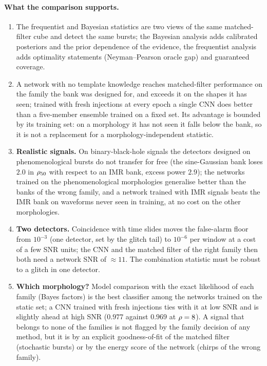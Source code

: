 \paragraph{What the comparison supports.}
\begin{enumerate}[nosep]
\item The frequentist and Bayesian statistics are two views of the same matched-filter cube and detect the same bursts; the Bayesian analysis adds calibrated posteriors and the prior dependence of the evidence, the frequentist analysis adds optimality statements (Neyman--Pearson oracle gap) and guaranteed coverage.
\item A network with no template knowledge reaches matched-filter performance on the family the bank was designed for, and exceeds it on the shapes it has seen; trained with fresh injections at every epoch a single CNN does better than a five-member ensemble trained on a fixed set. Its advantage is bounded by its training set: on a morphology it has not seen it falls below the bank, so it is not a replacement for a morphology-independent statistic.
\item \textbf{Realistic signals.} On binary-black-hole signals the detectors designed on phenomenological bursts do not transfer for free (the sine-Gaussian bank loses $2.0$ in $\rho_{50}$ with respect to an IMR bank, excess power $2.9$); the networks trained on the phenomenological morphologies generalise better than the banks of the wrong family, and a network trained with IMR signals beats the IMR bank on waveforms never seen in training, at no cost on the other morphologies.
\item \textbf{Two detectors.} Coincidence with time slides moves the false-alarm floor from $10^{-3}$ (one detector, set by the glitch tail) to $10^{-6}$ per window at a cost of a few SNR units; the CNN and the matched filter of the right family then both need a network SNR of $\approx11$. The combination statistic must be robust to a glitch in one detector.
\item \textbf{Which morphology?} Model comparison with the exact likelihood of each family (Bayes factors) is the best classifier among the networks trained on the static set; a CNN trained with fresh injections ties with it at low SNR and is slightly ahead at high SNR ($0.977$ against $0.969$ at $\rho=8$). A signal that belongs to none of the families is not flagged by the family decision of any method, but it is by an explicit goodness-of-fit of the matched filter (stochastic bursts) or by the energy score of the network (chirps of the wrong family).

\end{enumerate}

